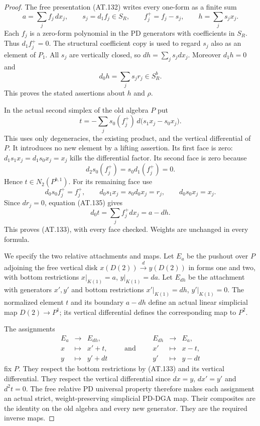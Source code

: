 \begin{proof}
The free presentation (AT.132) writes every one-form
as a finite sum
\[
              a=\sum_j f_j\,dx_j,\qquad
              s_j=d_1f_j\in S_R,\qquad
              f_j^+=f_j-s_j,\qquad
              h=\sum_j s_jx_j .
 \tag{AT.134}
\]
Each $f_j$ is a zero-form polynomial in the PD generators
with coefficients in $S_R$. Thus $d_1f_j^+=0$.
The structural coefficient copy is used to regard $s_j$
also as an element of $P_1$.
All $s_j$ are vertically closed, so
$dh=\sum_j s_jdx_j$.
Moreover $d_1h=0$ and
\[
                            d_0h=\sum_j s_jr_j\in S_R^b.
\]
This proves the stated assertions about $h$ and $\rho$.

In the actual second simplex of the old algebra $P$ put
\[
           t=-\sum_j s_0(f_j^+)\,
                         d\bigl(s_1x_j-s_0x_j\bigr).
 \tag{AT.135}
\]
This uses only degeneracies, the existing product, and the
vertical differential of $P$. It introduces no new element
by a lifting assertion.
Its first face is zero: $d_1s_1x_j=d_1s_0x_j=x_j$ kills
the differential factor. Its second face is zero because
\[
                         d_2s_0(f_j^+)=s_0d_1(f_j^+)=0.
\]
Hence $t\in N_2(P^{b,1})$.
For its remaining face use
\[
 d_0s_0f_j^+=f_j^+,\qquad
 d_0s_1x_j=s_0d_0x_j=r_j,\qquad d_0s_0x_j=x_j.
\]
Since $dr_j=0$, equation (AT.135) gives
\[
                  d_0t=\sum_j f_j^+dx_j=a-dh.
\]
This proves (AT.133), with every face checked.
Weights are unchanged in every formula.

We specify the two relative attachments and maps.
Let $E_a$ be the pushout over $P$ adjoining the free
vertical disk $x(D(2))\xrightarrow{d}y(D(2))$ in forms
one and two, with bottom restrictions
$x|_{K(1)}=a$, $y|_{K(1)}=da$.
Let $E_{dh}$ be the attachment with generators $x',y'$
and bottom restrictions $x'|_{K(1)}=dh$,
$y'|_{K(1)}=0$.
The normalized element $t$ and its boundary $a-dh$
define an actual linear simplicial map $D(2)\to P^1$;
its vertical differential defines the corresponding
map to $P^2$.

The assignments
\[
 \begin{array}{rcl}
 E_a&\longrightarrow&E_{dh},\\
 x&\longmapsto&x'+t,\\
 y&\longmapsto&y'+dt
 \end{array}
 \qquad\text{and}\qquad
 \begin{array}{rcl}
 E_{dh}&\longrightarrow&E_a,\\
 x'&\longmapsto&x-t,\\
 y'&\longmapsto&y-dt
 \end{array}
 \tag{AT.136}
\]
fix $P$. They respect the bottom restrictions by
(AT.133) and its vertical differential.
They respect the vertical differential since $dx=y$,
$dx'=y'$ and $d^2t=0$.
The free relative PD universal property therefore makes
each assignment an actual strict, weight-preserving
simplicial PD-DGA map. Their composites are the identity
on the old algebra and every new generator.
They are the required inverse maps.


\end{proof}
